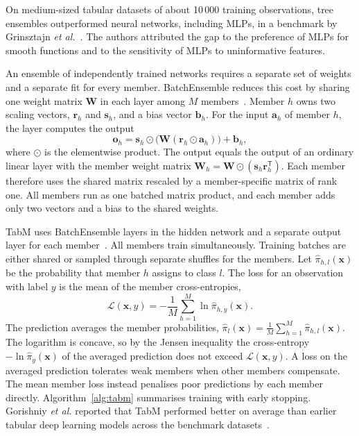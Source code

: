\documentclass[conference]{IEEEtran}
\begin{document}
On medium-sized tabular datasets of about 10\,000 training observations, tree ensembles outperformed neural networks, including MLPs, in a benchmark by Grinsztajn \emph{et al.}~\cite{grinsztajn2022}. The authors attributed the gap to the preference of MLPs for smooth functions and to the sensitivity of MLPs to uninformative features.

An ensemble of independently trained networks requires a separate set of weights and a separate fit for every member. BatchEnsemble reduces this cost by sharing one weight matrix $\mathbf{W}$ in each layer among $M$ members~\cite{wen2020}. Member $h$ owns two scaling vectors, $\mathbf{r}_h$ and $\mathbf{s}_h$, and a bias vector $\mathbf{b}_h$. For the input $\mathbf{a}_h$ of member $h$, the layer computes the output
\begin{equation}
    \mathbf{o}_h = \mathbf{s}_h \odot \big(\mathbf{W}(\mathbf{r}_h \odot \mathbf{a}_h)\big) + \mathbf{b}_h,
\end{equation}
where $\odot$ is the elementwise product. The output equals the output of an ordinary linear layer with the member weight matrix $\mathbf{W}_h = \mathbf{W} \odot (\mathbf{s}_h\mathbf{r}_h^{\mathsf T})$. Each member therefore uses the shared matrix rescaled by a member-specific matrix of rank one. All members run as one batched matrix product, and each member adds only two vectors and a bias to the shared weights.

TabM uses BatchEnsemble layers in the hidden network and a separate output layer for each member~\cite{gorishniy2025}. All members train simultaneously. Training batches are either shared or sampled through separate shuffles for the members. Let $\hat{\pi}_{h,l}(\mathbf{x})$ be the probability that member $h$ assigns to class $l$. The loss for an observation with label $y$ is the mean of the member cross-entropies,
\begin{equation}
    \mathcal{L}(\mathbf{x}, y) = -\frac{1}{M}\sum_{h=1}^{M} \ln \hat{\pi}_{h,y}(\mathbf{x}).
\end{equation}
The prediction averages the member probabilities, $\hat{\pi}_l(\mathbf{x}) = \frac{1}{M}\sum_{h=1}^{M}\hat{\pi}_{h,l}(\mathbf{x})$. The logarithm is concave, so by the Jensen inequality the cross-entropy $-\ln\hat{\pi}_y(\mathbf{x})$ of the averaged prediction does not exceed $\mathcal{L}(\mathbf{x}, y)$. A loss on the averaged prediction tolerates weak members when other members compensate. The mean member loss instead penalises poor predictions by each member directly. Algorithm~\ref{alg:tabm} summarises training with early stopping. Gorishniy \emph{et al.} reported that TabM performed better on average than earlier tabular deep learning models across the benchmark datasets~\cite{gorishniy2025}.
\end{document}
